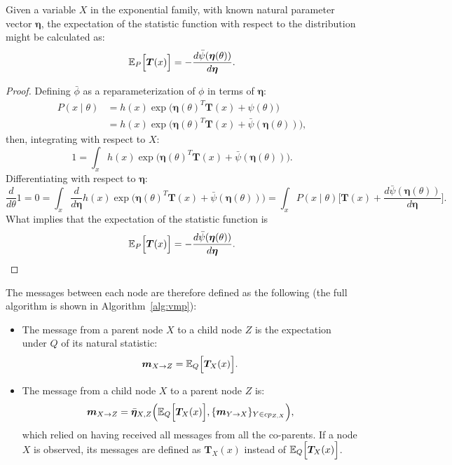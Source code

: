 \begin{proposition}\label{prop:vmp}
  Given a variable \(X\) in the exponential family, with known natural parameter vector \(\bm{\eta}\),  the expectation of the statistic function with respect to the distribution might be calculated as:
    \[
    \mathbb{E}_{P}\Big[\bm{T}(x)\Big] =   -  \frac{ d\bar{\psi}(\bm{\eta}(\theta)) }{d \bm{\eta}}.
  \]
\end{proposition}
\begin{proof}
  Defining \(\bar{\phi}\) as a reparameterization of \(\phi\) in terms of \(\bm{\eta}\):
  \[
    \begin{aligned}
      P(x\mid \theta) &= h(x)\exp \Big( \bm{\eta}{(\theta)}^{T}\bm{T}(x) + \psi(\theta) \Big)\\
       &= h(x)\exp \Big( \bm{\eta}{(\theta)}^{T}\bm{T}(x) + \bar{\psi}(\bm{\eta}(\theta)) \Big),
    \end{aligned}
  \]
  then, integrating with respect to \(X\):
  \[
    1 = \int_{x} h(x)\exp \Big( \bm{\eta}{(\theta)}^{T}\bm{T}(x) + \bar{\psi}(\bm{\eta}(\theta)) \Big).
  \]
  Differentiating with respect to \(\bm{\eta}\):
  \[
    \frac{d}{d\theta}1 = 0 = \int_{x} \frac{d}{d\bm{\eta}}h(x)\exp \Big( \bm{\eta}{(\theta)}^{T}\bm{T}(x) + \bar{\psi}(\bm{\eta}(\theta)) \Big) = \int_{x}P(x \mid \theta)\Big[ \bm{T}(x) + \frac{ d\bar{\psi}(\bm{\eta}(\theta)) }{d \bm{\eta}}\Big].
  \]
  What implies that the expectation of the statistic function is
  \[
    \mathbb{E}_{P}\Big[\bm{T}(x)\Big] =   -  \frac{ d\bar{\psi}(\bm{\eta}(\theta)) }{d \bm{\eta}}.
  \]
\end{proof}

The messages between each node are therefore defined as the following (the full algorithm is shown in Algorithm~\ref{alg:vmp}):
\begin{itemize}
  \item The message from a parent node \( X \) to a child node \( Z \) is the expectation under \( Q \) of its natural statistic:
    \[
    \bm{m}_{X \to Z} = \mathbb{E}_{Q}\Big[\bm{T}_{X}(x)\Big].
    \]
  \item The message from a child node \( X \) to a parent node \( Z \) is:
    \[
    \bm{m}_{X \to Z} = \bar{\bm{\eta}}_{X,Z}\Big(\mathbb{E}_{Q}\Big[\bm{T}_X(x)\Big], \{\bm{m}_{Y \to X}\}_{Y \in cp_{Z,X}}\Big),
    \]
    which relied on having received all messages from all the co-parents. If a node \( X \)  is observed, its messages are defined as \( \bm{T}_X(x) \) instead of \( \mathbb{E}_{Q}\Big[\bm{T}_X(x)\Big] \).
\end{itemize}

